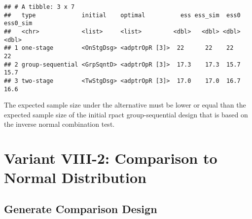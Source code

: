 \documentclass[
]{book}
\newenvironment{Shaded}{\begin{snugshade}}{\end{snugshade}}
\newcommand{\DecValTok}[1]{\textcolor[rgb]{0.00,0.00,0.81}{#1}}
\newcommand{\FunctionTok}[1]{\textcolor[rgb]{0.00,0.00,0.00}{#1}}
\newcommand{\NormalTok}[1]{#1}
\newcommand{\SpecialCharTok}[1]{\textcolor[rgb]{0.00,0.00,0.00}{#1}}
\newcommand{\StringTok}[1]{\textcolor[rgb]{0.31,0.60,0.02}{#1}}
\begin{document}
\begin{verbatim}
## # A tibble: 3 x 7
##   type             initial    optimal          ess ess_sim  ess0 ess0_sim
##   <chr>            <list>     <list>         <dbl>   <dbl> <dbl>    <dbl>
## 1 one-stage        <OnStgDsg> <adptrOpR [3]>  22      22    22       22  
## 2 group-sequential <GrpSqntD> <adptrOpR [3]>  17.3    17.3  15.7     15.7
## 3 two-stage        <TwStgDsg> <adptrOpR [3]>  17.0    17.0  16.7     16.6
\end{verbatim}

The expected sample size under the alternative must be lower or equal than the expected sample size of the initial rpact group-sequential design that is based on the inverse normal combination test.

\begin{Shaded}
\end{Shaded}

\hypertarget{variant-viii-2-comparison-to-normal-distribution}{%
\section{Variant VIII-2: Comparison to Normal Distribution}\label{variant-viii-2-comparison-to-normal-distribution}}

\hypertarget{generate-comparison-design}{%
\subsection{Generate Comparison Design}\label{generate-comparison-design}}
\end{document}
